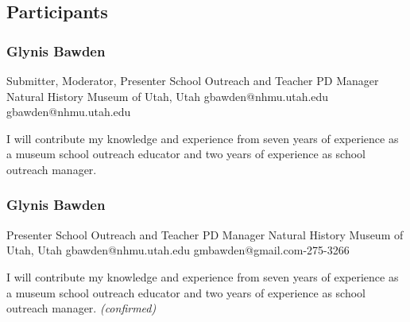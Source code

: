 \documentclass{report}
\begin{document}
            \subsection*{Participants}
              \subsubsection*{ Glynis Bawden }
              Submitter, Moderator, Presenter\newline
              School Outreach and Teacher PD Manager\newline
              Natural History Museum of Utah, Utah
              \newline
              gbawden@nhmu.utah.edu\newline
              gbawden@nhmu.utah.edu\newline

              I will contribute my knowledge and experience from seven years of experience as a museum school outreach educator and two years of experience as school outreach manager.\newline


              

              
                \subsubsection*{ Glynis Bawden }
                Presenter\newline
                School Outreach and Teacher PD Manager\newline
                Natural History Museum of Utah, Utah
                \newline
                gbawden@nhmu.utah.edu\newline
                gmbawden@gmail.com-275-3266\newline

                I will contribute my knowledge and experience from seven years of experience as a museum school outreach educator and two years of experience as school outreach manager.
                \emph{ (confirmed) }
              

              

              
\end{document}
